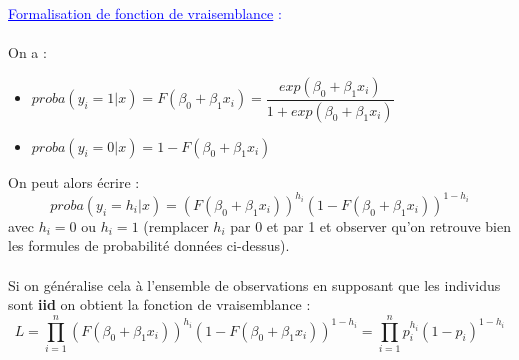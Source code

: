 \documentclass[12pt,aspectratio=1610]{beamer}
\begin{document}
\begin{frame}
			\textcolor{blue}{\large \underline{Formalisation de fonction de vraisemblance} : \\~\\}	
	On a  : 
	\begin{itemize}
		\item $proba(y_i=1|x)=F(\beta_0+\beta_1x_i)=\dfrac{exp(\beta_0+\beta_1x_i)}{1+exp(\beta_0+\beta_1x_i)}$
		\item $proba(y_i=0|x)=1-F(\beta_0+\beta_1x_i)$
	\end{itemize}
	
	On peut alors écrire : 
	$$proba(y_i=h_i|x)=\left( F(\beta_0+\beta_1x_i)\right)^{h_i} \left(1- F(\beta_0+\beta_1x_i)\right)^{1-h_i}$$ 
	avec $h_i=0$ ou $h_i=1$ (remplacer $h_i$ par 0 et par 1 et observer qu'on retrouve bien les formules de probabilité données  ci-dessus).\\~\\
	
	 Si on  généralise cela à l'ensemble de observations en supposant que les individus sont \textbf{iid} on obtient la fonction de vraisemblance : 
	$$L=\prod_{i=1}^{n} \left( F(\beta_0+\beta_1x_i)\right)^{h_i} \left(1- F(\beta_0+\beta_1x_i)\right)^{1-h_i} = \prod_{i=1}^{n}p_i^{h_i}(1-p_i)^{1-h_i}$$
\end{frame}
\end{document}
